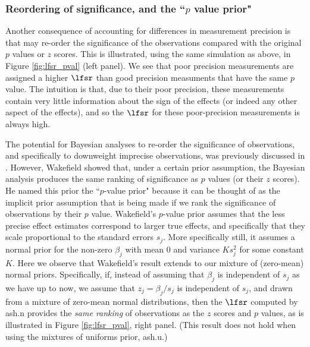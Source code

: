 \subsubsection*{Reordering of significance, and the ``$p$ value prior"}

Another consequence of accounting for differences in measurement precision is that \ashr may re-order the significance of the observations compared
 with the original $p$ values or $z$ scores. This is illustrated, using the same simulation as above, in Figure \ref{fig:lfsr_pval} (left panel).
 We see that poor precision measurements are assigned a higher $\lfsr$ than good precision measuments that have the same $p$ value.
 The intuition is that, due to their poor precision, these measurements contain very little information about the sign of the effects (or indeed any other aspect of the effects),
 and so the $\lfsr$ for these poor-precision measurements is always high.

The potential for Bayesian analyses to re-order the significance of observations, and specifically to downweight imprecise observations,
was previously discussed in \cite{guan.stephens.08}. However, Wakefield \cite{wakefield:2009} showed that, under a certain prior assumption, the Bayesian analysis produces the same ranking of significance as $p$ values (or their $z$ scores). He named this prior the ``$p$-value prior" because it can be thought of as the 
implicit prior assumption that is being made if we rank the significance of observations by their $p$ value.
Wakefield's $p$-value prior assumes that the less precise effect estimates correspond to larger true effects, and specifically that they scale proportional
to the standard errors $s_j$. More specifically still, it assumes a normal prior for the non-zero $\beta_j$ with mean 0 and variance $K s^2_j$ for some constant $K$.
Here we observe that Wakefield's result extends to our mixture of (zero-mean) normal priors. Specifically, if, instead of assuming that $\beta_j$ is independent
of $s_j$ as we have up to now, we assume that $z_j=\beta_j/s_j$ is independent of $s_j$, and drawn from a mixture of zero-mean normal distributions,
then the $\lfsr$ computed by ash.n provides the {\it same ranking} of observations as the $z$ scores and $p$ values,
as is illustrated in Figure \ref{fig:lfsr_pval}, right panel. (This result does not hold when using the mixtures of uniforms prior, ash.u.)

